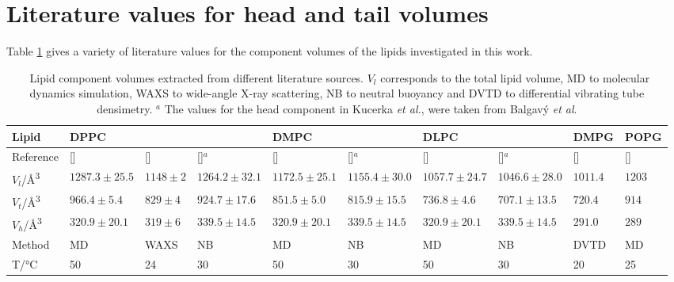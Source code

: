 \documentclass[11pt,a4paper]{paper}
\begin{document}
\section{Literature values for head and tail volumes}
Table \ref{tab:water} gives a variety of literature values for the component volumes of the lipids investigated in this work.
\begin{table}
  \centering
	\caption{\ Lipid component volumes extracted from different literature sources. $V_l$ corresponds to the total lipid volume, MD to molecular dynamics simulation, WAXS to wide-angle X-ray scattering, NB to neutral buoyancy and DVTD to differential vibrating tube densimetry. $^a$ The values for the head component in Kucerka \emph{et al.},\cite{Kucerka2004} were taken from Balgav\'{y} \emph{et al}.\cite{Balgavy2001}}
  \centering
	\label{tab:water}
	\begin{tabular}{l|lll|ll|ll|l|l}
    Lipid & DPPC & & & DMPC & & DLPC & & DMPG & POPG \\
    \hline
    Reference & [\cite{Armen1998}] & [\cite{Sun1994}] & [\cite{Kucerka2004,Balgavy2001}]$^a$ & [\cite{Armen1998}] & [\cite{Kucerka2004,Balgavy2001}]$^a$ & [\cite{Armen1998}] & [\cite{Kucerka2004,Balgavy2001}]$^a$ & [\cite{Pan2012}] & [\cite{Kucerka2012}] \\
    \hline
    $V_l$/\si{\angstrom^3} & $1287.3\pm25.5$ & $1148\pm2$ & $1264.2\pm32.1$ & $1172.5\pm25.1$ & $1155.4\pm30.0$ & $1057.7\pm24.7$ & $1046.6\pm28.0$ & $1011.4$ & $1203$ \\
    $V_t$/\si{\angstrom^3} & $966.4\pm5.4$ & $829\pm4$ & $924.7\pm17.6$ & $851.5\pm5.0$ & $815.9\pm15.5$ & $736.8\pm4.6$ & $707.1\pm13.5$ & $720.4$ & $914$ \\
    $V_h$/\si{\angstrom^3} & $320.9\pm20.1$ & $319\pm6$ & $339.5\pm14.5$ & $320.9\pm20.1$ & $339.5\pm14.5$ & $320.9\pm20.1$ & $339.5\pm14.5$ & $291.0$ & $289$ \\
    Method & MD & WAXS & NB & MD & NB & MD & NB & DVTD & MD \\
    T/\si{\celsius} & 50 & 24 & 30 & 50 & 30 & 50 & 30 & 20 & 25 \\
	\end{tabular}
\end{table}
\end{document}
